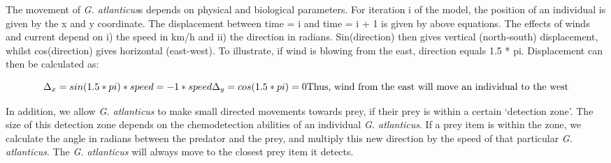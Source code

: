 \documentclass[
]{article}
\begin{document}
The movement of \emph{G. atlanticus}s depends on physical and biological
parameters. For iteration i of the model, the position of an individual
is given by the x and y coordinate. The displacement between time = i
and time = i + 1 is given by above equations. The effects of winds and
current depend on i) the speed in km/h and ii) the direction in radians.
Sin(direction) then gives vertical (north-south) displacement, whilst
cos(direction) gives horizontal (east-west). To illustrate, if wind is
blowing from the east, direction equals 1.5 * pi. Displacement can then
be calculated as:

\[
\Delta_{x} = sin(1.5 * pi) * speed = -1*speed \\
\Delta_{y} = cos(1.5*pi) = 0 \\
\text{Thus, wind from the east will move an individual to the west}
\]

In addition, we allow \emph{G. atlanticus} to make small directed
movements towards prey, if their prey is within a certain `detection
zone'. The size of this detection zone depends on the chemodetection
abilities of an individual \emph{G. atlanticus}. If a prey item is
within the zone, we calculate the angle in radians between the predator
and the prey, and multiply this new direction by the speed of that
particular \emph{G. atlanticus}. The \emph{G. atlanticus} will always
move to the closest prey item it detects.
\end{document}
